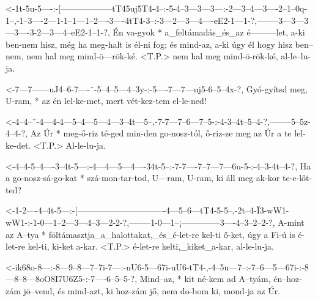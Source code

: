   {<-1t-5u-5----:-[------------------tT45uj5T4-4--:-5-4--3---3---3---:-2---3--4---3----2--1--0q-1--,-1--3----2---1-1--1---1--2----3----4tT4-3--:-3---2---3---4----eE2-1---1-?,--------3---3---3---3----3-2---3---4--eE2-1--1-?,}
  {  Én va-gyok * a_feltámadás_és_az é---------let, a-ki ben-nem hisz, még ha meg-halt is él-ni fog; és mind-az, a-ki úgy él hogy hisz ben--nem, nem hal meg mind-ö---rök-ké.  <T.P.> nem hal meg mind-ö-rök-ké, al-le--lu-ja.}


  {<-7---7------uJ4--6-7----¨-5--4--5---4--3y-:-5----7---7---uj5-6--5--4x-?,}
  {  Gyó-gyítsd meg, U-ram, * az én lel-ke-met, mert vét-kez-tem el-le-ned!}


  {<-4--4--¨-4---4-4---5--4---5---4---3--4t---5--,-7-7---7--6---7--5-:-4-3--4t--5--4-?,--------5--5z-4--4-?,}
  {  Az Úr * meg-ő-riz té-ged min-den go-nosz-tól, ő-riz-ze meg az Úr  a te lel-ke-det. <T.P.> Al-le-lu-ja.}

  {<-4--4-5--4----3--4t-5---:-4---4---5---4----34t-5--:-7-7----7--7---7---6u-5-:-4--3-4t--4-?,}
  {  Ha a go-nosz-sá-go-kat * szá-mon-tar-tod, U---ram, U-ram, ki áll meg ak-kor te-e-lőt-ted?}

  {<-1-2----4--4t-5---:-[-------------------------------4---5--6---tT4-5-5--,-2t--4-Ï3-wW1-wW1-:-1-0---1--2---3---4--3---2-2-?,--------1-0---1--¡--------------3----4--3--2--2-?,}
  {  A-mint az A--tya * föltámasztja_a_halottakat,_és_é-let-re kel-ti  ő-ket, úgy a Fi-ú   is    é-let-re kel-ti, ki-ket a-kar. <T.P.> é-let-re kelti,_kiket_a-kar, al-le-lu-ja.}

  {<-ik68o-8---:-8---9--8---7--7i-7---:-uU6-5---67i-uU6-tT4-,-4--5u---7--:-7--6---5---67i-:-8---8--8---8oO8I7U6Z5-:-7----6--5--5-?,}
  {  Mind--az, * kit né-kem ad A--tyám, én--hoz-zám jö--vend, és mind-azt, ki hoz-zám jő,   nem do-bom ki,          mond-ja az Úr.}
